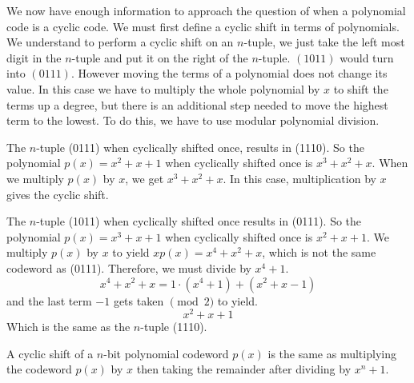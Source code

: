 We now have enough information to approach the question of when a polynomial code is a cyclic code.  We must first define a cyclic shift in terms of polynomials.  We understand to perform a cyclic shift on an $n$-tuple, we just take the left most digit in the $n$-tuple and put it on the right of the $n$-tuple.  $(1011)$ would turn into $(0111)$.  However moving the terms of a polynomial does not change its value.  In this case we have to multiply the whole polynomial by $x$ to shift the terms up a degree, but there is an additional step needed to move the highest term to the lowest.  To do this, we have to use modular polynomial division.  

\begin{example}
The $n$-tuple (0111) when cyclically shifted once, results in (1110).  So the polynomial $p(x) = x^2 + x + 1$ when cyclically shifted once is $x^3 + x^2 + x$.  When we multiply $p(x)$ by $x$, we get $x^3 + x^2 + x$.  In this case, multiplication by $x$ gives the cyclic shift.

The $n$-tuple (1011) when cyclically shifted once results in (0111).  So the polynomial $p(x) = x^3 + x + 1$ when cyclically shifted once is $x^2 + x + 1$.  We multiply $p(x)$ by $x$ to yield $xp(x) = x^4 + x^2 + x$, which is not the same codeword as (0111).  Therefore, we must divide by $x^4 + 1$.
\[x^4 + x^2 + x = 1\cdot (x^4 + 1) + (x^2 + x - 1)\]
and the last term $-1$ gets taken $\pmod 2$ to yield.
\[x^2 + x + 1\]
Which is the same as the $n$-tuple (1110).
\end{example}

\begin{prop}\label{proposition:polycodes:cyclicremainder}
A cyclic shift of a $n$-bit polynomial codeword $p(x)$ is the same as multiplying the codeword $p(x)$ by $x$ then taking the remainder after dividing by $x^n + 1$.
\end{prop}

